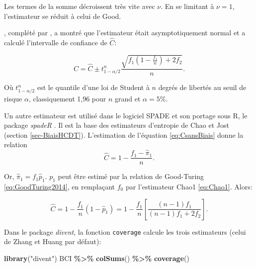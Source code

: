 \documentclass[
  11pt,
  american,
  a4paper,
  extrafontsizes,onecolumn,openright
  ]{memoir}
\newenvironment{Shaded}{\begin{snugshade}}{\end{snugshade}}
\newcommand{\FunctionTok}[1]{\textcolor[rgb]{0.13,0.29,0.53}{\textbf{#1}}}
\newcommand{\NormalTok}[1]{#1}
\newcommand{\SpecialCharTok}[1]{\textcolor[rgb]{0.81,0.36,0.00}{\textbf{#1}}}
\newcommand{\StringTok}[1]{\textcolor[rgb]{0.31,0.60,0.02}{#1}}
\begin{document}
Les termes de la somme décroissent très vite avec \(\nu\).
En se limitant à \(\nu=1\), l'estimateur se réduit à celui de Good.

\textcite{Esty1983}, complété par \textcite{Zhang2009}, a montré que l'estimateur était asymptotiquement normal et a calculé l'intervalle de confiance de \(\hat{C}\):

\begin{equation}
  \label{eq:hatC}
  C = \hat{C} \pm t^{n}_{1 - \alpha / 2} \frac{\sqrt{f_1 \left( 1 - \frac{f_{1}}{n} \right) + 2f_2}}{n}.
\end{equation}

Où \(t^{n}_{1 - \alpha / 2}\) est le quantile d'une loi de Student à \(n\) degrés de libertés au seuil de risque \(\alpha\), classiquement 1,96 pour \(n\) grand et \(\alpha = 5\%\).

Un autre estimateur est utilisé dans le logiciel SPADE \autocite{Chao2010a} et son portage sous R, le package \emph{spadeR} \autocite{Chao2016c}.
Il est la base des estimateurs d'entropie de Chao et Jost (section \ref{sec-BiaisHCDT}).
L'estimation de l'équation \eqref{eq:CsansBiais} donne la relation
\begin{equation}
  \label{eq:hatC2}
  \hat{C} = 1 - \frac{f_{1} - \hat{\pi}_1}{n}.
\end{equation}

Or, \(\hat{\pi}_1 = f_{1} \hat{p}_1\).
\(p_1\) peut être estimé par la relation de Good-Turing \eqref{eq:GoodTuring2014}, en remplaçant \(f_0\) par l'estimateur Chao1 \eqref{eq:Chao1}.
Alors:

\begin{equation} 
  \label{eq:CChao}
  \hat{C} 
  = 1 - \frac{f_1}{n}(1 - \hat{p}_1)
  = 1 - \frac{f_1}{n}\left[ \frac{\left( n - 1 \right) f_1}{\left( n - 1 \right) f_1 + 2f_2} \right].
\end{equation}

Dans le package \emph{divent}, la fonction \texttt{coverage} calcule les trois estimateurs (celui de Zhang et Huang par défaut):

\scriptsize

\begin{Shaded}
\begin{Highlighting}[]
\FunctionTok{library}\NormalTok{(}\StringTok{"divent"}\NormalTok{)}
\NormalTok{BCI }\SpecialCharTok{\%\textgreater{}\%} 
  \FunctionTok{colSums}\NormalTok{() }\SpecialCharTok{\%\textgreater{}\%} 
  \FunctionTok{coverage}\NormalTok{()}
\end{Highlighting}
\end{Shaded}
\end{document}
